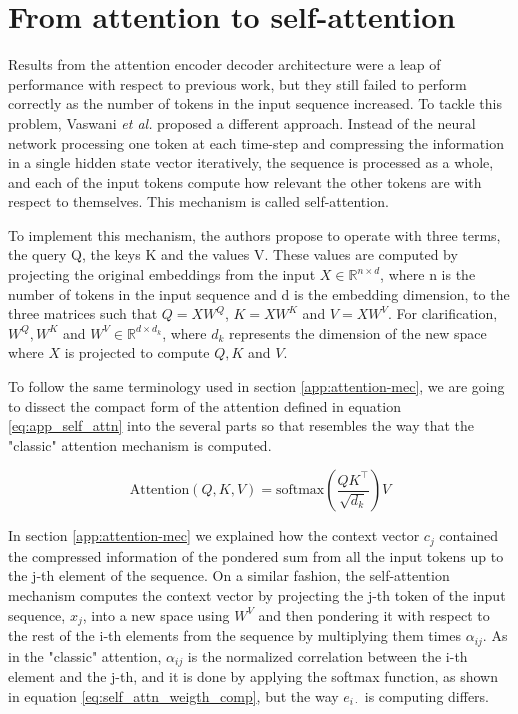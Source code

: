 \section{From attention to self-attention}
\label{from_att_2_selfatt}
Results from the attention encoder decoder architecture were a leap of performance with respect to previous work, but they still failed to perform correctly as the number of tokens in the input sequence increased. To tackle this problem, Vaswani \textit{et al.} proposed a different approach. Instead of the neural network processing one token at each time-step and compressing the information in a single hidden state vector iteratively, the sequence is processed as a whole, and each of the input tokens compute how relevant the other tokens are with respect to themselves. This mechanism is called self-attention.

To implement this mechanism, the authors propose to operate with three terms, the query Q, the keys K and the values V. These values are computed by projecting the original embeddings from the input $X \in \mathbb{R}^{n \times d}$, where n is the number of tokens in the input sequence and d is the embedding dimension, to the three matrices such that $Q = XW^Q$, $K = XW^K$ and $V = XW^V$. For clarification, $W^Q, W^K$ and $W^V \in  \mathbb{R}^{d \times d_k}$, where $d_k$ represents the dimension of the new space where $X$ is projected to compute $Q, K$ and $V$.

To follow the same terminology used in section \ref{app:attention-mec}, we are going to dissect the compact form of the attention defined in equation \ref{eq:app_self_attn} into the several parts so that resembles the way that the "classic" attention mechanism is computed.

\begin{equation}
	\label{eq:app_self_attn}
	\text{Attention}(Q, K, V) = \text{softmax}\left(\frac{QK^\top}{\sqrt{d_k}}\right) V
\end{equation}

In section \ref{app:attention-mec} we explained how the context vector $c_j$ contained the compressed information of the pondered sum from all the input tokens up to the j-th element of the sequence. On a similar fashion, the self-attention mechanism computes the context vector by projecting the j-th token of the input sequence, $x_j$, into a new space using $W^V$ and then pondering it with respect to the rest of the i-th elements from the sequence by multiplying them times $\alpha_{ij}$. As in the "classic" attention, $\alpha_{ij}$ is the normalized correlation between the i-th element and the j-th, and it is done by applying the softmax function, as shown in equation \ref{eq:self_attn_weigth_comp}, but the way $e_{i\cdot}$ is computing differs.

